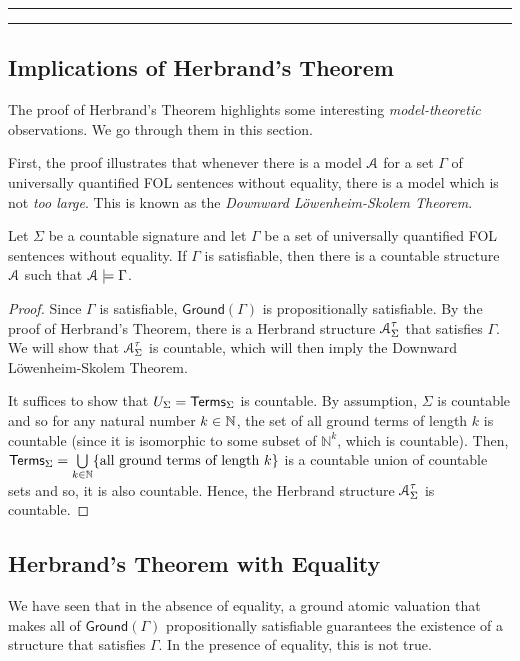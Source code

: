 \documentclass[11pt,usenames, dvipsnames]{article}
\begin{document}
\vspace{5truemm}
\hrule
\hrule

\subsection{\large \centering Implications of Herbrand's Theorem}
\noindent

The proof of Herbrand's Theorem highlights some interesting \emph{model-theoretic} observations. We go through them in this section.

First, the proof illustrates that whenever there is a model $\struct$ for a set $\Gamma$ of universally quantified FOL sentences without equality, there is a model which is not \emph{too large}. This is known as the \emph{Downward Löwenheim-Skolem Theorem}.

\begin{theorem}
  Let $\Sigma$ be a countable signature and let $\Gamma$ be a set of universally quantified FOL sentences without equality. If $\Gamma$ is satisfiable, then there is a countable structure $\struct$ such that $\struct \models \Gamma$.
\end{theorem}

\begin{proof}
  Since $\Gamma$ is satisfiable, $\mathsf{Ground}(\Gamma)$ is propositionally satisfiable. By the proof of Herbrand's Theorem, there is a Herbrand structure $\struct_\Sigma^\tau$ that satisfies $\Gamma$. We will show that $\struct_\Sigma^\tau$ is countable, which will then imply the Downward Löwenheim-Skolem Theorem.

  It suffices to show that $U_\Sigma = \mathsf{Terms}_\Sigma$ is countable. By assumption, $\Sigma$ is countable and so for any natural number $k \in \mathbb{N}$, the set of all ground terms of length $k$ is countable (since it is isomorphic to some subset of $\mathbb{N}^k$, which is countable). Then, $\mathsf{Terms}_\Sigma = \bigcup\limits_{k \in \mathbb{N}}\{\text{all ground terms of length } k\}$ is a countable union of countable sets and so, it is also countable. Hence, the Herbrand structure $\struct_\Sigma^\tau$ is countable.
\end{proof}

\subsection{\large \centering Herbrand's Theorem with Equality}
\noindent

We have seen that in the absence of equality, a ground atomic valuation that makes all of $\mathsf{Ground}(\Gamma)$ propositionally satisfiable guarantees the existence of a structure that satisfies $\Gamma$. In the presence of equality, this is not true.
\end{document}
